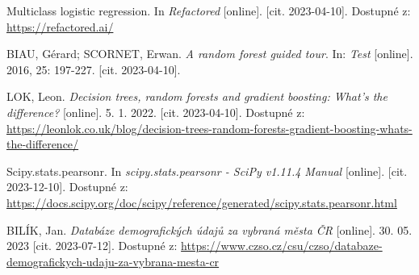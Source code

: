 \begin{thebibliography}{1}
Multiclass logistic regression. In \textit{Refactored} [online]. [cit. 2023-04-10]. Dostupné z: \url{https://refactored.ai/}

BIAU, Gérard; SCORNET, Erwan. \textit{A random forest guided tour}. In: \textit{Test} [online]. 2016, 25: 197-227. [cit. 2023-04-10].

LOK, Leon. \textit{Decision trees, random forests and gradient boosting: What's the difference?} [online]. 5. 1. 2022. [cit. 2023-04-10]. Dostupné z: \url{https://leonlok.co.uk/blog/decision-trees-random-forests-gradient-boosting-whats-the-difference/}

Scipy.stats.pearsonr. In \textit{scipy.stats.pearsonr - SciPy v1.11.4 Manual} [online]. [cit. 2023-12-10]. Dostupné z: \url{https://docs.scipy.org/doc/scipy/reference/generated/scipy.stats.pearsonr.html} 

BILÍK, Jan. \textit{Databáze demografických údajů za vybraná města ČR} [online]. 30. 05. 2023 [cit. 2023-07-12]. Dostupné z: \url{https://www.czso.cz/csu/czso/databaze-demografickych-udaju-za-vybrana-mesta-cr}

\end{thebibliography}
	
% 
	
	
